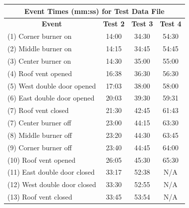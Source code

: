 \documentclass[12pt,oneside]{book}
\begin{document}
\begin{figure}[!ht]
\begin{minipage}[b]{0.8\columnwidth}
	\begin{flushleft}
	\small
	\begin{tabular}{lccc}
\multicolumn{4}{c}{\normalsize Event Times (mm:ss) for Test Data File} \\
\toprule
\multicolumn{1}{c}{\textbf{Event}} & \textbf{Test 2} & \textbf{Test 3} & \textbf{Test 4} \\
\midrule
(1) Corner burner on 			& 	14:00		  &	   34:30		&	   54:30	\\
(2) Middle burner on 			&   14:15		  &	   34:45		&	   54:45	\\
(3) Center burner on 			&   14:30		  &	   35:00		&	   55:00	\\
(4) Roof vent opened 			&   16:38		  &    36:30		&	   56:30	\\
(5) West double door opened 	&	17:03		  &	   38:00 		&	   58:00 	\\
(6) East double door opened 	&   20:03		  &    39:30		&	   59:31	\\
(7) Roof vent closed		 	&   21:30		  &    42:45		&	   61:43	\\
(7) Center burner off 			&   23:00		  &    44:15		&	   63:30	\\
(8) Middle burner off 			&   23:20		  &    44:30		&	   63:45	\\
(9) Corner burner off 			&   23:40		  &    44:45		&	   64:00	\\
(10) Roof vent opened			& 	26:05 		  &	   45:30		&	   65:30	\\
(11) East double door closed	& 	33:17 		  &	   52:38		&	   N/A	\\
(12) West double door closed	& 	33:30 		  &	   52:55		&	   N/A	\\
(13) Roof vent closed		 	&   33:45		  &    53:54		&	   N/A	\\
\bottomrule
\end{tabular}


\end{flushleft}
\end{minipage}
\end{figure}
\end{document}
